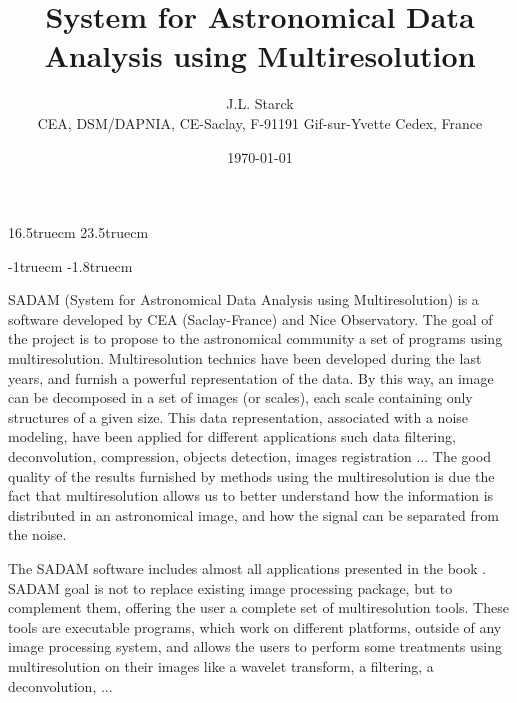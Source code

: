 
\textwidth 16.5truecm
\textheight 23.5truecm
\oddsidemargin=0pt
\evensidemargin=0pt

\hoffset -1truecm
\voffset -1.8truecm


\pagestyle{empty}

\title{System for Astronomical Data Analysis using  Multiresolution}

\vspace{1cm}
\author{J.L. Starck \\ [12pt] 
 CEA, DSM/DAPNIA, CE-Saclay, F-91191 Gif-sur-Yvette Cedex, France}

\date{\today}



\maketitle

SADAM (System for Astronomical Data Analysis using Multiresolution) is a 
software developed by CEA (Saclay-France) and Nice Observatory. The
goal of the project is to propose to the astronomical community 
a set of programs using multiresolution. Multiresolution technics have
been developed during the last years, and furnish a powerful representation
of the data. By this way, an image can be decomposed in a set 
of images (or scales), each scale containing only structures of a given size. 
This data representation, associated with a noise modeling, 
have been applied for different applications such data filtering, 
deconvolution, compression, objects detection, images registration ... 
The good quality of the results furnished by methods using the multiresolution 
is due the fact that multiresolution allows us  
to better understand how the information is distributed in an
astronomical image, and how the signal can be separated from the noise.

The SADAM software includes almost all applications presented in the book 
\cite{starck97}. SADAM goal is not to replace existing image
 processing  package, but to complement
them, offering the user a complete set of multiresolution tools. These tools
are executable programs, which work on different platforms, outside of any 
image processing system, and allows the users to perform some treatments
using multiresolution on their images like a wavelet transform, a filtering, 
a deconvolution, ...

